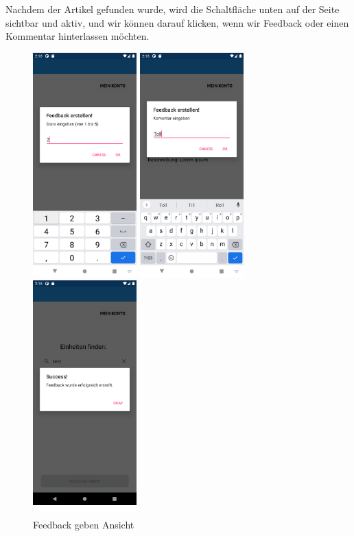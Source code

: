 Nachdem der Artikel gefunden wurde, wird die Schaltfläche unten auf der Seite sichtbar und aktiv, und wir können darauf klicken, wenn wir Feedback oder einen Kommentar hinterlassen möchten.
\begin{figure}[h]
    \begin{center}
    \includegraphics[width=4cm]{pics/Xamarin Student/10 Feedback Star.png}\hfill
    \includegraphics[width=4cm]{pics/Xamarin Student/11 Feedback comm.png}\hfill
    \includegraphics[width=4cm]{pics/Xamarin Student/12 Feedback success.png}
    \caption[HomePage Feedback geben]{Feedback geben Ansicht}
    \end{center}
\end{figure}

